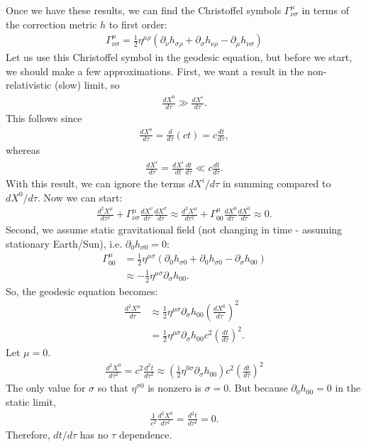 \documentclass{article}
\theoremstyle{definition}
\begin{document}
Once we have these results, we can find the Christoffel symbols $\Gamma^{\mu}_{\nu\sigma}$ in terms of the correction metric $h$ to first order:
\begin{align*}
\boxed{\Gamma^{\mu}_{\nu\sigma} = \frac{1}{2}\eta^{\mu\rho}\left(\partial_\nu h_{\sigma\rho} + \partial_\sigma h_{\nu\rho} - \partial_\mu h_{\nu\sigma} \right) }
\end{align*}
Let us use this Christoffel symbol in the geodesic equation, but before we start, we should make a few approximations. First, we want a result in the non-relativistic (slow) limit, so
\begin{align*}
\frac{dX^0}{d\tau} \gg \frac{dX^i}{d\tau}.
\end{align*}
This follows since
\begin{align*}
\frac{dX^0}{d\tau} = \frac{d}{d\tau}(ct) = c\frac{dt}{d\tau},
\end{align*}
whereas
\begin{align*}
\frac{dX^i}{d\tau} = \frac{dX^i}{dt}\frac{dt}{d\tau} \ll c\frac{dt}{d\tau}.
\end{align*}
With this result, we can ignore the terms $dX^i/d\tau$ in summing compared to $dX^0/d\tau$. Now we can start:
\begin{align*}
\frac{d^2X^\mu}{d\tau^2} + \Gamma^{\mu}_{\nu\sigma}\frac{dX^\nu}{d\tau}\frac{dX^\sigma}{d\tau} \approx \frac{d^2X^\mu}{d\tau^2} + \Gamma^{\mu}_{00}\frac{dX^0}{d\tau}\frac{dX^0}{d\tau} \approx 0.
\end{align*}
Second, we assume static gravitational field (not changing in time - assuming stationary Earth/Sun), i.e. $\partial_0 h_{\sigma 0 } = 0$:
\begin{align*}
\Gamma^{\mu}_{00} &= \frac{1}{2}\eta^{\mu\sigma}\left( \partial_0h_{\sigma 0} + \partial_0 h_{\sigma 0} - \partial_\sigma h_{00}\right) \\
&\approx -\frac{1}{2}\eta^{\mu\sigma}\partial_{\sigma}h_{00}.
\end{align*} 
So, the geodesic equation becomes:
\begin{align*}
\frac{d^2X^\mu}{d\tau} &\approx  \frac{1}{2}\eta^{\mu\sigma}\partial_{\sigma}h_{00}\left( \frac{dX^0}{d\tau} \right)^2\\
&= \frac{1}{2}\eta^{\mu\sigma}\partial_{\sigma}h_{00}c^2\left( \frac{dt}{d\tau} \right)^2.
\end{align*}
Let $\mu = 0$. 
\begin{align*}
\frac{d^2X^0}{d\tau^2} = c^2\frac{d^2t}{d\tau^2} \approx \left(\frac{1}{2}\eta^{0\sigma}\partial_\sigma h_{00} \right)c^2\left(\frac{dt}{d\tau} \right) ^2 
\end{align*}
The only value for $\sigma$ so that $\eta^{\sigma 0}$ is nonzero is $\sigma = 0$. But because $\partial_0 h_{00} = 0$ in the static limit,
\begin{align*}
\frac{1}{c^2}\frac{d^2X^0}{d\tau^2} = \frac{d^2t}{d\tau^2} = 0.
\end{align*}
Therefore, $dt/d\tau$ has no $\tau$ dependence.\\
\end{document}
